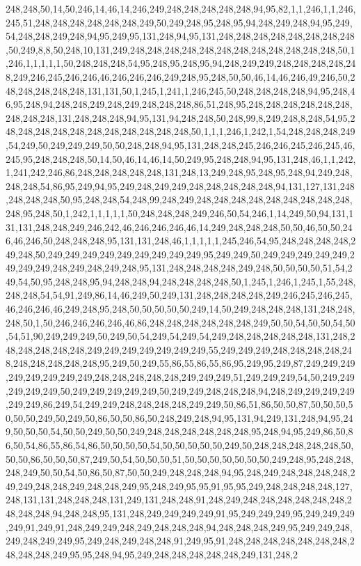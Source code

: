 248,248,50,14,50,246,14,46,14,246,249,248,248,248,248,248,94,95,82,1,1,246,1,1,246,245,51,248,248,248,248,248,248,249,50,249,248,95,248,95,94,248,249,248,94,95,249,54,248,248,249,248,94,95,249,95,131,248,94,95,131,248,248,248,248,248,248,248,248,50,249,8,8,50,248,10,131,249,248,248,248,248,248,248,248,248,248,248,248,248,50,1,246,1,1,1,1,1,50,248,248,248,54,95,248,95,248,95,94,248,249,249,248,248,248,248,248,249,246,245,246,246,46,246,246,246,249,248,95,248,50,50,46,14,46,246,49,246,50,248,248,248,248,248,131,131,50,1,245,1,241,1,246,245,50,248,248,248,248,94,95,248,46,95,248,94,248,248,249,248,249,248,248,248,86,51,248,95,248,248,248,248,248,248,248,248,248,131,248,248,248,94,95,131,94,248,248,50,248,99,8,249,248,8,248,54,95,248,248,248,248,248,248,248,248,248,248,248,50,1,1,1,246,1,242,1,54,248,248,248,249,54,249,50,249,249,249,50,50,248,248,94,95,131,248,248,245,246,246,245,246,245,46,245,95,248,248,248,50,14,50,46,14,46,14,50,249,95,248,248,94,95,131,248,46,1,1,242,1,241,242,246,86,248,248,248,248,248,131,248,13,249,248,95,248,95,248,94,249,248,248,248,54,86,95,249,94,95,249,248,249,249,248,248,248,248,248,94,131,127,131,248,248,248,248,50,95,248,248,54,248,99,248,249,248,248,248,248,248,248,248,248,248,248,95,248,50,1,242,1,1,1,1,1,50,248,248,248,249,246,50,54,246,1,14,249,50,94,131,131,131,248,248,249,246,242,46,246,246,246,46,14,249,248,248,248,50,50,46,50,50,246,46,246,50,248,248,248,95,131,131,248,46,1,1,1,1,1,245,246,54,95,248,248,248,248,249,248,50,249,249,249,249,249,249,249,249,249,95,249,249,50,249,249,249,249,249,249,249,249,248,249,248,249,248,95,131,248,248,248,248,249,248,50,50,50,50,51,54,249,54,50,95,248,248,95,94,248,248,94,248,248,248,248,50,1,245,1,246,1,245,1,55,248,248,248,54,54,91,249,86,14,46,249,50,249,131,248,248,248,248,249,246,245,246,245,46,246,246,46,249,248,95,248,50,50,50,50,50,249,14,50,249,248,248,248,131,248,248,248,50,1,50,246,246,246,246,46,86,248,248,248,248,248,248,249,50,50,54,50,50,54,50,54,51,90,249,249,249,50,249,50,54,249,54,249,54,249,248,248,248,248,248,131,248,248,248,248,248,248,249,249,249,249,249,249,249,55,249,249,249,248,248,248,248,248,248,248,248,248,248,95,249,50,249,55,86,55,86,55,86,95,249,95,249,87,249,249,249,249,249,249,249,249,248,248,248,248,248,249,249,249,51,249,249,249,54,50,249,249,249,249,249,50,249,249,249,249,249,50,249,249,248,248,248,94,248,249,249,249,249,249,249,86,249,54,249,249,248,248,248,248,249,249,50,86,51,86,50,50,87,50,50,50,50,50,50,249,50,249,50,86,50,50,86,50,248,249,248,94,95,131,94,249,131,248,94,95,249,50,50,50,54,50,50,249,50,50,249,248,248,248,248,248,248,95,248,94,95,249,86,50,86,50,54,86,55,86,54,86,50,50,50,50,54,50,50,50,50,50,249,50,248,248,248,248,248,50,50,50,86,50,50,50,87,249,50,54,50,50,50,51,50,50,50,50,50,50,50,249,248,95,248,248,248,249,50,50,54,50,86,50,87,50,50,249,248,248,248,94,95,248,249,248,248,248,248,249,249,248,248,249,248,248,249,95,248,249,95,95,91,95,95,249,248,248,248,248,127,248,131,131,248,248,248,131,249,131,248,248,91,248,249,248,248,248,248,248,248,248,248,248,94,248,248,95,131,248,249,249,249,249,91,95,249,249,249,95,249,249,249,249,91,249,91,248,249,249,248,249,248,248,248,94,248,248,248,249,95,249,249,248,249,248,249,249,95,249,248,249,248,248,91,249,95,91,248,248,248,248,248,248,248,248,248,248,249,95,95,248,94,95,249,248,248,248,248,248,249,131,248,2